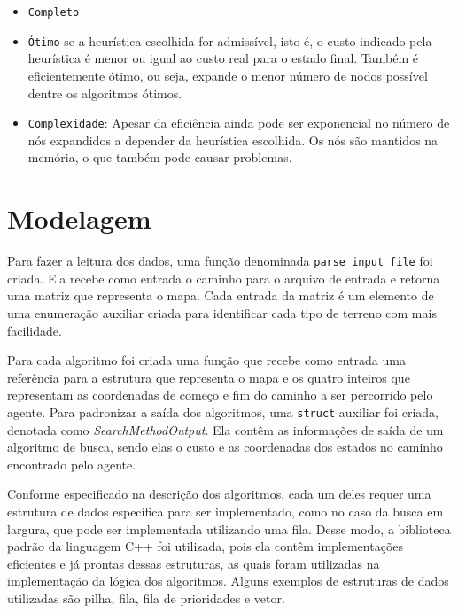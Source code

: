 \documentclass{article}
\begin{document}
\begin{itemize}
	      \begin{itemize}
		      \item \texttt{Completo}
		      \item \texttt{Ótimo} se a heurística escolhida for admissível, isto é, o custo indicado pela heurística é menor ou igual
		            ao custo real para o estado final. Também é eficientemente ótimo, ou seja, expande o
		            menor número de nodos possível dentre os
		            algoritmos ótimos.
		      \item \texttt{Complexidade}: Apesar da eficiência ainda pode ser exponencial no número de nós expandidos a depender da heurística escolhida. Os nós são mantidos na memória,
		            o que também pode causar problemas.
	      \end{itemize}

\end{itemize}

\section{Modelagem}

Para fazer a leitura dos dados, uma função denominada \texttt{parse\_input\_file} foi criada. Ela recebe como entrada o caminho
para o arquivo de entrada e retorna uma matriz que representa o mapa. Cada entrada da matriz é um elemento de uma enumeração auxiliar
criada para identificar cada tipo de terreno com mais facilidade.

Para cada algoritmo foi criada uma função que recebe como entrada uma referência para a estrutura que representa o mapa e os quatro inteiros que representam
as coordenadas de começo e fim do caminho a ser percorrido pelo agente. Para padronizar a saída dos algoritmos, uma \texttt{struct} auxiliar foi criada,
denotada como \textit{SearchMethodOutput}. Ela contêm as informações de saída de um algoritmo de busca, sendo elas o custo e as coordenadas dos estados no caminho encontrado
pelo agente.

Conforme especificado na descrição dos algoritmos, cada um deles requer uma estrutura de dados específica para ser implementado, como no caso da busca em largura, que pode
ser implementada utilizando uma fila. Desse modo, a biblioteca padrão da linguagem C++ foi utilizada, pois ela contêm implementações eficientes e já prontas dessas estruturas,
as quais foram utilizadas na implementação da lógica dos algoritmos. Alguns exemplos de estruturas de dados utilizadas são pilha, fila, fila de prioridades e vetor.
\end{document}
